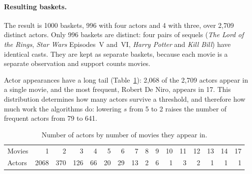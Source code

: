 \paragraph{Resulting baskets.} The result is 1000 baskets, 996 with four actors and 4 with three, over 2{,}709 distinct actors. Only 996 baskets are distinct: four pairs of sequels (\emph{The Lord of the Rings}, \emph{Star Wars} Episodes~V and~VI, \emph{Harry Potter} and \emph{Kill Bill}) have identical casts. They are kept as separate baskets, because each movie is a separate observation and support counts movies.

Actor appearances have a long tail (Table~\ref{tab:appearances}): 2{,}068 of the 2{,}709 actors appear in a single movie, and the most frequent, Robert De Niro, appears in 17. This distribution determines how many actors survive a threshold, and therefore how much work the algorithms do: lowering $s$ from 5 to 2 raises the number of frequent actors from 79 to 641.

\begin{table}[ht]
  \centering
  \caption{Number of actors by number of movies they appear in.}
  \label{tab:appearances}
  \begin{tabular}{l*{15}{r}}
    \toprule
    Movies & 1 & 2 & 3 & 4 & 5 & 6 & 7 & 8 & 9 & 10 & 11 & 12 & 13 & 14 & 17 \\
    Actors & 2068 & 370 & 126 & 66 & 20 & 29 & 13 & 2 & 6 & 1 & 3 & 2 & 1 & 1 & 1 \\
    \bottomrule
  \end{tabular}
\end{table}
